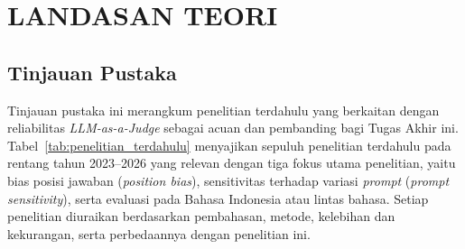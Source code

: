 \chapter{LANDASAN TEORI}

\section{Tinjauan Pustaka}

Tinjauan pustaka ini merangkum penelitian terdahulu yang berkaitan dengan reliabilitas \textit{LLM-as-a-Judge} sebagai acuan dan pembanding bagi Tugas Akhir ini. Tabel~\ref{tab:penelitian_terdahulu} menyajikan sepuluh penelitian terdahulu pada rentang tahun 2023--2026 yang relevan dengan tiga fokus utama penelitian, yaitu bias posisi jawaban (\textit{position bias}), sensitivitas terhadap variasi \textit{prompt} (\textit{prompt sensitivity}), serta evaluasi pada Bahasa Indonesia atau lintas bahasa. Setiap penelitian diuraikan berdasarkan pembahasan, metode, kelebihan dan kekurangan, serta perbedaannya dengan penelitian ini.

